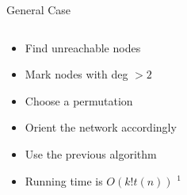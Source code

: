 \begin{frame}{General Case}

\begin{columns}
\begin{column}{0.65\textwidth}
\begin{itemize}[<+>]
\item Find unreachable nodes
\item Mark nodes with deg $> 2$
\item Choose a permutation
\item Orient the network accordingly 
\item Use the previous algorithm
\item Running time is $O(k!t(n))$ $^1$ 
\end{itemize}

\end{column}
\begin{column}{0.4\textwidth}
\begin{center}

\end{center}
\end{column}
\end{columns}

\end{frame}